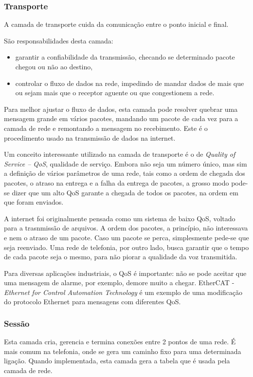 \subsubsection{Transporte}
 A camada de transporte cuida da comunicação entre o ponto inicial e final.

 São responsabilidades desta camada:
 \begin{itemize}
	 \item garantir a confiabilidade da transmissão, checando se determinado pacote chegou ou não ao destino,
	 \item controlar o fluxo de dados na rede, impedindo de mandar dados de mais que ou sejam mais que o receptor aguente ou que congestionem a rede.
 \end{itemize}
 
 Para melhor ajustar o fluxo de dados, esta camada pode resolver quebrar uma mensagem grande em vários pacotes, mandando um pacote de cada vez para a camada de rede e remontando a mensagem no recebimento. Este é o procedimento usado na transmissão de dados na internet.

 Um conceito interessante utilizado na camada de transporte é o de \emph{Quality of Service -- QoS}, qualidade de serviço. Embora não seja um número único, mas sim a definição de vários parâmetros de uma rede, tais como a ordem de chegada dos pacotes, o atraso na entrega e a falha da entrega de pacotes, a grosso modo pode-se dizer que um alto QoS garante a chegada de todos os pacotes, na ordem em que foram enviados.

 A internet foi originalmente pensada como um sistema de baixo QoS, voltado para a trasnmissão de arquivos. A ordem dos pacotes, a princípio, não interessava e nem o atraso de um pacote. Caso um pacote se perca, simplesmente pede-se que seja reenviado. Uma rede de telefonia, por outro lado, busca garantir que o tempo de cada pacote seja o mesmo, para não piorar a qualidade da voz transmitida.

 Para diversas aplicações industriais, o QoS é importante: não se pode aceitar que uma mensagem de alarme, por exemplo, demore muito a chegar. EtherCAT - \emph{Ethernet for Control Automation Technology} é um exemplo de uma modificação do protocolo Ethernet para mensagens com diferentes QoS.
 
\subsubsection{Sessão}
Esta camada cria, gerencia e termina conexões entre 2 pontos de uma rede. É mais comum na telefonia, onde se gera um caminho fixo para uma determinada ligação. Quando implementada, esta camada gera a tabela que é usada pela camada de rede.

